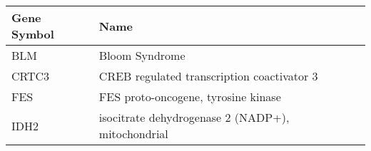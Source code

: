 \begin{tabular}{ll}
\toprule
Gene Symbol &                                              Name \\
\midrule
        BLM &                                    Bloom Syndrome \\
      CRTC3 &        CREB regulated transcription coactivator 3 \\
        FES &               FES proto-oncogene, tyrosine kinase \\
       IDH2 & isocitrate dehydrogenase 2 (NADP+), mitochondrial \\
\bottomrule
\end{tabular}

